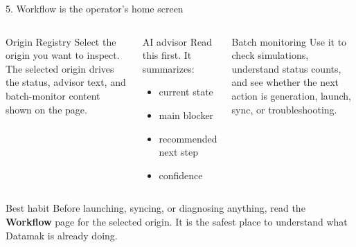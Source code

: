 \documentclass[aspectratio=169,11pt]{beamer}
\begin{document}
\begin{frame}{5. Workflow is the operator's home screen}
  \begin{columns}[T]
    \begin{block}{Origin Registry}
      Select the origin you want to inspect. The selected origin drives the
      status, advisor text, and batch-monitor content shown on the page.
    \end{block}

    \begin{block}{AI advisor}
      Read this first. It summarizes:
      \begin{itemize}
        \item current state
        \item main blocker
        \item recommended next step
        \item confidence
      \end{itemize}
    \end{block}

    \begin{block}{Batch monitoring}
      Use it to check simulations, understand status counts, and see whether
      the next action is generation, launch, sync, or troubleshooting.
    \end{block}
  \end{columns}

  \vspace{0.25em}
  \begin{block}{Best habit}
    Before launching, syncing, or diagnosing anything, read the \textbf{Workflow}
    page for the selected origin. It is the safest place to understand what
    Datamak is already doing.
  \end{block}
\end{frame}
\end{document}
